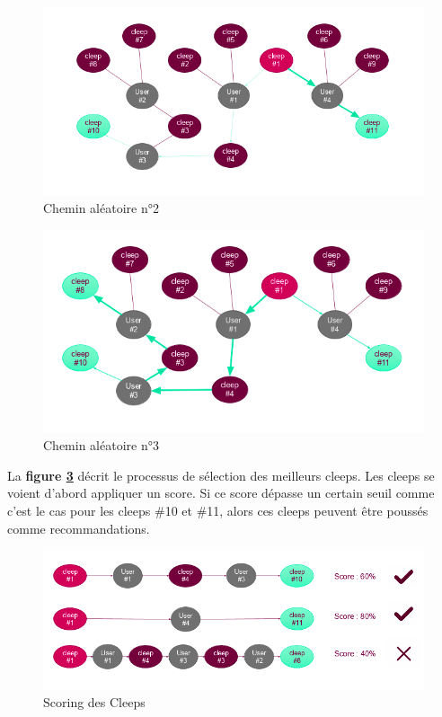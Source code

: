 \documentclass{article} %
\begin{document}
{\begin{figure}[!h]
 \centering
 \includegraphics[keepaspectratio = true,scale=0.6]{ex3}
 \caption{Chemin aléatoire n°2}
 \label{fig:ex3}
\end{figure}

\begin{figure}[!h]
 \centering
 \includegraphics[keepaspectratio = true,scale=0.6]{ex4}
 \caption{Chemin aléatoire n°3}
 \label{fig:ex4}
\end{figure}

La \textbf{figure \ref{fig:ex5}} décrit le processus de sélection des meilleurs cleeps. Les cleeps se voient d'abord appliquer un score. Si ce score dépasse un certain seuil comme c'est le cas pour les cleeps \#10 et \#11, alors ces cleeps peuvent être poussés comme recommandations.

\begin{figure}[!h]
 \centering
 \includegraphics[keepaspectratio = true,scale=0.6]{ex5}
 \caption{Scoring des Cleeps}
 \label{fig:ex5}
\end{figure}
\newpage

}
\end{document}
